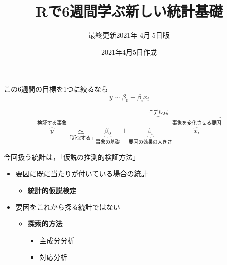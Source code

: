 \documentclass[
  ignorenonframetext,
  pandoc,
  jafont = haranoaji,
  a4paper,
  everyparhook = compat,
  japaram = {units = true}]{bxjsarticle}
\title{Rで6週間学ぶ新しい統計基礎}
\subtitle{最終更新2021年 4月 5日版}
\author[]{}
\date{2021年4月5日作成}
\newif\ifbibliography
\providecommand{\tightlist}{%
  \setlength{\itemsep}{0pt}\setlength{\parskip}{0pt}}
\newcommand*{\img}[1]{%
    \raisebox{-.3\baselineskip}{%
        \texttt{[image: \#1]}%
    }%
}
\begin{document}
\frame{\titlepage}

\begin{frame}
  \tableofcontents[hideallsubsections]
\end{frame}
\begin{frame}
\newcommand*{\img}[1]{%
    \raisebox{-.3\baselineskip}{%
        \texttt{[image: \#1]}%
    }%
}


\end{frame}

\begin{frame}{この6週間の目標を1つに絞るなら}
\protect\hypertarget{ux3053ux306e6ux9031ux9593ux306eux76eeux6a19ux30921ux3064ux306bux7d5eux308bux306aux3089}{}
\[
y \sim \beta_0 + \beta_i x_i
\]

\[
\overbrace{y}^{\text{検証する事象}} \underbrace{\sim}_{\text{「近似する」}} \overbrace{\underbrace{\beta_0}_{\text{事象の基礎}} + \underbrace{\beta_i}_{\text{要因の効果の大きさ}} \overbrace{x_i}^{\text{事象を変化させる要因}}}^{\text{モデル式}}
\]
\end{frame}

\begin{frame}{今回扱う統計は，「仮説の推測的検証方法」}
\protect\hypertarget{ux4ecaux56deux6271ux3046ux7d71ux8a08ux306fux4eeeux8aacux306eux63a8ux6e2cux7684ux691cux8a3cux65b9ux6cd5}{}
\begin{itemize}
\tightlist
\item
  要因に既に当たりが付いている場合の統計

  \begin{itemize}
  \tightlist
  \item
    \textbf{統計的仮説検定}
  \end{itemize}
\item
  要因をこれから探る統計ではない

  \begin{itemize}
  \tightlist
  \item
    \textbf{探索的方法}

    \begin{itemize}
    \tightlist
    \item
      主成分分析
    \item
      対応分析
    \end{itemize}
  \end{itemize}
\end{itemize}
\end{frame}

\begin{frame}{}
\protect\hypertarget{section}{}
\end{frame}


%
\begin{frame}[allowframebreaks]{}
  \bibliographytrue
  \printbibliography[heading=none]
\end{frame}
\end{document}
